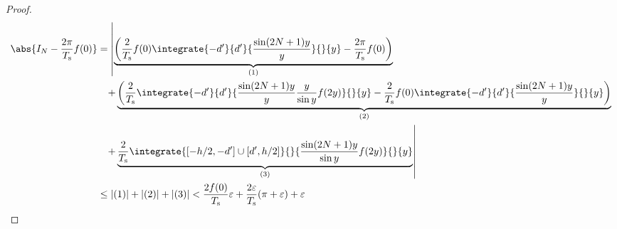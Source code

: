 \begin{proof}
					\begin{align*}
						\abs{I_N - \frac{2\pi}{T_\text{s}} f(0)} &= \left|\underbrace{\left(\frac{2}{T_\text{s}}f(0)\integrate{-d'}{d'}{\frac{\sin(2N+1)y}{y}}{}{y} - \frac{2\pi}{T_\text{s}} f(0)\right)}_{(1)} \right. \\
						&\phantom{=} \left.+ \underbrace{\left(\frac{2}{T_\text{s}}\integrate{-d'}{d'}{\frac{\sin(2N+1)y}{y}\frac{y}{\sin y}f(2y)}{}{y} - \frac{2}{T_\text{s}}f(0)\integrate{-d'}{d'}{\frac{\sin(2N+1)y}{y}}{}{y}\right)}_{(2)} \right. \\
						&\phantom{=} \left.+ \underbrace{\frac{2}{T_\text{s}}\integrate{[-h/2,-d']\cup[d',h/2]}{}{\frac{\sin(2N+1)y}{\sin y}f(2y)}{}{y}}_{(3)}\right| \\
						&\leq |(1)| + |(2)| + |(3)| < \frac{2f(0)}{T_\text{s}}\varepsilon + \frac{2\varepsilon}{T_\text{s}}(\pi+\varepsilon) + \varepsilon
					\end{align*}
				\end{proof}

